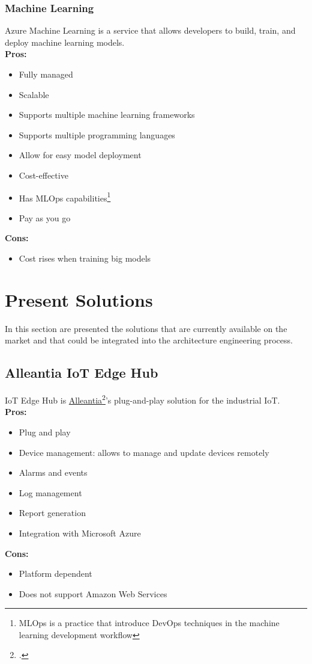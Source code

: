         \subsubsection{Machine Learning}
        \label{azure:machine-learning}
 Azure Machine Learning is a service that allows developers to build, train, and deploy machine learning models.\\
        \textbf{Pros:}
        \begin{itemize}
            \item Fully managed
            \item Scalable
            \item Supports multiple machine learning frameworks
            \item Supports multiple programming languages
            \item Allow for easy model deployment
            \item Cost-effective
            \item Has MLOps capabilities\footnote{MLOps is a practice that introduce DevOps techniques in the machine learning development workflow}
            \item Pay as you go
        \end{itemize}
        \textbf{Cons:}
        \begin{itemize}
            \item Cost rises when training big models
        \end{itemize}

\section{Present Solutions}
In this section are presented the solutions that are currently available on the market and that could be integrated into the architecture engineering process.

\subsection{Alleantia IoT Edge Hub}
\label{alleantia}
IoT Edge Hub is \href{www.alleantia.com}{Alleantia}\footcite{site:alleantia}'s plug-and-play solution for the industrial IoT.\\
\textbf{Pros:}
\begin{itemize}
    \item Plug and play
    \item Device management: allows to manage and update devices remotely
    \item Alarms and events
    \item Log management
    \item Report generation
    \item Integration with Microsoft Azure
\end{itemize}
\textbf{Cons:}
\begin{itemize}
    \item Platform dependent
    \item Does not support Amazon Web Services
\end{itemize}

